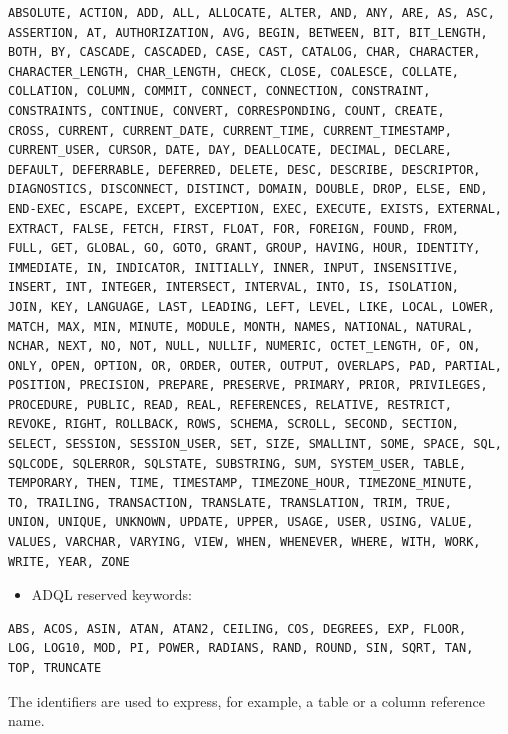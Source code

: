 \documentclass[11pt,a4paper]{ivoa}
\begin{document}
\begin{verbatim}
ABSOLUTE, ACTION, ADD, ALL, ALLOCATE, ALTER, AND, ANY, ARE, AS, ASC,
ASSERTION, AT, AUTHORIZATION, AVG, BEGIN, BETWEEN, BIT, BIT_LENGTH,
BOTH, BY, CASCADE, CASCADED, CASE, CAST, CATALOG, CHAR, CHARACTER,
CHARACTER_LENGTH, CHAR_LENGTH, CHECK, CLOSE, COALESCE, COLLATE,
COLLATION, COLUMN, COMMIT, CONNECT, CONNECTION, CONSTRAINT,
CONSTRAINTS, CONTINUE, CONVERT, CORRESPONDING, COUNT, CREATE,
CROSS, CURRENT, CURRENT_DATE, CURRENT_TIME, CURRENT_TIMESTAMP,
CURRENT_USER, CURSOR, DATE, DAY, DEALLOCATE, DECIMAL, DECLARE,
DEFAULT, DEFERRABLE, DEFERRED, DELETE, DESC, DESCRIBE, DESCRIPTOR,
DIAGNOSTICS, DISCONNECT, DISTINCT, DOMAIN, DOUBLE, DROP, ELSE, END,
END-EXEC, ESCAPE, EXCEPT, EXCEPTION, EXEC, EXECUTE, EXISTS, EXTERNAL,
EXTRACT, FALSE, FETCH, FIRST, FLOAT, FOR, FOREIGN, FOUND, FROM,
FULL, GET, GLOBAL, GO, GOTO, GRANT, GROUP, HAVING, HOUR, IDENTITY,
IMMEDIATE, IN, INDICATOR, INITIALLY, INNER, INPUT, INSENSITIVE,
INSERT, INT, INTEGER, INTERSECT, INTERVAL, INTO, IS, ISOLATION,
JOIN, KEY, LANGUAGE, LAST, LEADING, LEFT, LEVEL, LIKE, LOCAL, LOWER,
MATCH, MAX, MIN, MINUTE, MODULE, MONTH, NAMES, NATIONAL, NATURAL,
NCHAR, NEXT, NO, NOT, NULL, NULLIF, NUMERIC, OCTET_LENGTH, OF, ON,
ONLY, OPEN, OPTION, OR, ORDER, OUTER, OUTPUT, OVERLAPS, PAD, PARTIAL,
POSITION, PRECISION, PREPARE, PRESERVE, PRIMARY, PRIOR, PRIVILEGES,
PROCEDURE, PUBLIC, READ, REAL, REFERENCES, RELATIVE, RESTRICT,
REVOKE, RIGHT, ROLLBACK, ROWS, SCHEMA, SCROLL, SECOND, SECTION,
SELECT, SESSION, SESSION_USER, SET, SIZE, SMALLINT, SOME, SPACE, SQL,
SQLCODE, SQLERROR, SQLSTATE, SUBSTRING, SUM, SYSTEM_USER, TABLE,
TEMPORARY, THEN, TIME, TIMESTAMP, TIMEZONE_HOUR, TIMEZONE_MINUTE,
TO, TRAILING, TRANSACTION, TRANSLATE, TRANSLATION, TRIM, TRUE,
UNION, UNIQUE, UNKNOWN, UPDATE, UPPER, USAGE, USER, USING, VALUE,
VALUES, VARCHAR, VARYING, VIEW, WHEN, WHENEVER, WHERE, WITH, WORK,
WRITE, YEAR, ZONE
\end{verbatim}

\begin{itemize}
\item ADQL reserved keywords:
\end{itemize}

\begin{verbatim}
ABS, ACOS, ASIN, ATAN, ATAN2, CEILING, COS, DEGREES, EXP, FLOOR,
LOG, LOG10, MOD, PI, POWER, RADIANS, RAND, ROUND, SIN, SQRT, TAN,
TOP, TRUNCATE
\end{verbatim}

The identifiers are used to express, for example, a table or a column
reference name.
\end{document}

